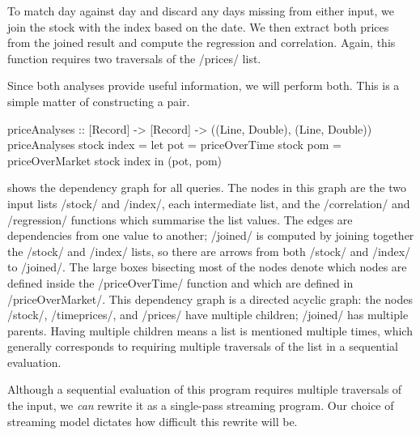 
To match day against day and discard any days missing from either input, we join the stock with the index based on the date.
We then extract both prices from the joined result and compute the regression and correlation.
Again, this function requires two traversals of the \Hs/prices/ list.

Since both analyses provide useful information, we will perform both.
This is a simple matter of constructing a pair.

\begin{haskell}
priceAnalyses :: [Record] -> [Record] -> ((Line, Double), (Line, Double))
priceAnalyses stock index =
  let pot = priceOverTime   stock
      pom = priceOverMarket stock index
  in (pot, pom)
\end{haskell}

 shows the dependency graph for all queries.
The nodes in this graph are the two input lists \Hs/stock/ and \Hs/index/, each intermediate list, and the \Hs/correlation/ and \Hs/regression/ functions which summarise the list values.
The edges are dependencies from one value to another; \Hs/joined/ is computed by joining together the \Hs/stock/ and \Hs/index/ lists, so there are arrows from both \Hs/stock/ and \Hs/index/ to \Hs/joined/.
The large boxes bisecting most of the nodes denote which nodes are defined inside the \Hs/priceOverTime/ function and which are defined in \Hs/priceOverMarket/.
This dependency graph is a directed acyclic graph: the nodes \Hs/stock/, \Hs/timeprices/, and \Hs/prices/ have multiple children; \Hs/joined/ has multiple parents.
Having multiple children means a list is mentioned multiple times, which generally corresponds to requiring multiple traversals of the list in a sequential evaluation.

Although a sequential evaluation of this program requires multiple traversals of the input, we \emph{can} rewrite it as a single-pass streaming program.
Our choice of streaming model dictates how difficult this rewrite will be.

